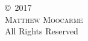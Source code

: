 \phantom{}\vspace{\fill}
\begin{center}
\copyright~2017\\
\textsc{Matthew Moocarme}\\
All Rights Reserved\\
\end{center}